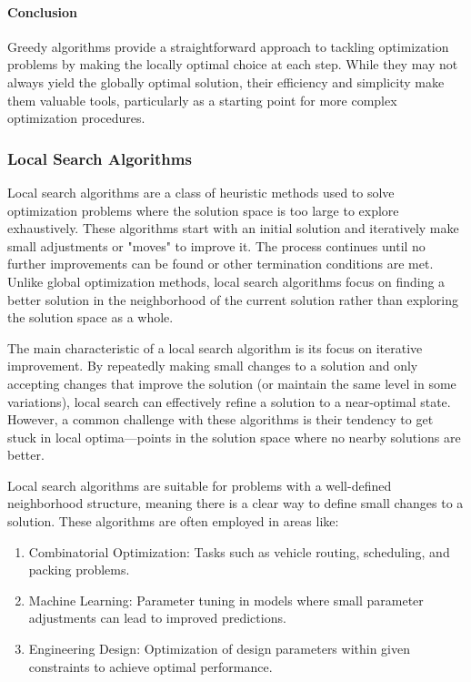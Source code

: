 \documentclass{article}
\begin{document}
    \paragraph{Conclusion}

    Greedy algorithms provide a straightforward approach to tackling optimization problems by making the locally optimal choice at each step. While they may not always yield the globally optimal solution, their efficiency and simplicity make them valuable tools, particularly as a starting point for more complex optimization procedures.

    \subsubsection{Local Search Algorithms}\label{local-search-algorithms}

    Local search algorithms are a class of heuristic methods used to solve optimization problems where the solution space is too large to explore exhaustively. These algorithms start with an initial solution and iteratively make small adjustments or "moves" to improve it. The process continues until no further improvements can be found or other termination conditions are met. Unlike global optimization methods, local search algorithms focus on finding a better solution in the neighborhood of the current solution rather than exploring the solution space as a whole. \cite{gao2021local}

    The main characteristic of a local search algorithm is its focus on iterative improvement. By repeatedly making small changes to a solution and only accepting changes that improve the solution (or maintain the same level in some variations), local search can effectively refine a solution to a near-optimal state. However, a common challenge with these algorithms is their tendency to get stuck in local optima—points in the solution space where no nearby solutions are better. \cite{gao2021local}

    Local search algorithms are suitable for problems with a well-defined neighborhood structure, meaning there is a clear way to define small changes to a solution. These algorithms are often employed in areas like:

    \begin{enumerate}
        \item Combinatorial Optimization: Tasks such as vehicle routing, scheduling, and packing problems.
        \item Machine Learning: Parameter tuning in models where small parameter adjustments can lead to improved predictions.
        \item Engineering Design: Optimization of design parameters within given constraints to achieve optimal performance.
    \end{enumerate}
\end{document}
